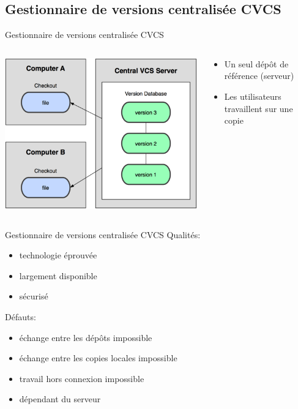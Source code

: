 \subsection{Gestionnaire de versions centralisée CVCS}
\begin{frame}{Gestionnaire de versions centralisée CVCS}
  \begin{columns}[T]

    \begin{column}{.6\textwidth}
      \includegraphics[width=\textwidth]{./CVCS.png}
    \end{column}

    \begin{column}{.4\textwidth}
      \begin{itemize}
        \item{Un seul dépôt de référence (serveur)}
        \item{Les utilisateurs travaillent sur une copie}
      \end{itemize}
    \end{column}

  \end{columns}
\end{frame}

\begin{frame}{Gestionnaire de versions centralisée CVCS}
  Qualités:
  \begin{itemize}
    \item{technologie éprouvée}
    \item{largement disponible}
    \item{sécurisé}
  \end{itemize}

  Défauts:
  \begin{itemize}
    \item{échange entre les dépôts impossible}
    \item{échange entre les copies locales impossible}
    \item{travail hors connexion impossible}
    \item{dépendant du serveur}
  \end{itemize}
\end{frame}

